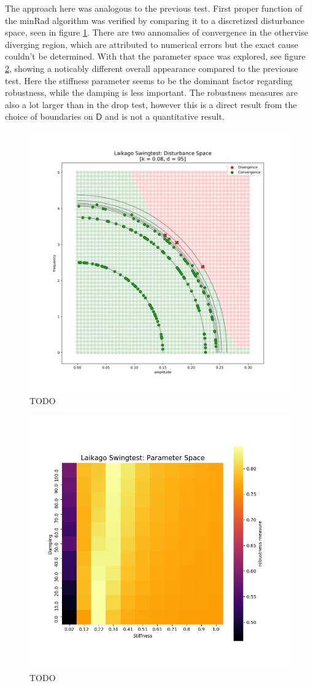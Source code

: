     The approach here was analogous to the previous test. First proper function of the minRad algorithm was verified by comparing it to a discretized disturbance space, seen in figure \ref{fig:swingoverlay}. There are two annomalies of convergence in the othervise diverging region, which are attributed to numerical errors but the exact cause couldn't be determined. With that the parameter space was explored, see figure \ref{fig:swingps}, showing a noticably different overall appearance compared to the previouse test. Here the stiffness parameter seems to be the dominant factor regarding robustness, while the damping is less important. The robustness measures are also a lot larger than in the drop test, however this is a direct result from the choice of boundaries on $\mathsf{D}$ and is not a quantitative result.   
    \begin{figure}[h]\label{fig:swingoverlay}
    \centering
    \includegraphics[width=.7\linewidth]{figures/swingtest_ds_overay_v3.png}
    \caption{TODO}
    \end{figure}    

    \begin{figure}[h]
    \centering
    \includegraphics[width=.7\linewidth]{figures/swingtest_ps.png}
    \caption{TODO}
    \label{fig:swingps}
    \end{figure}    

